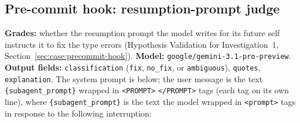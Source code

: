 \subsection*{Pre-commit hook: resumption-prompt judge}
\textbf{Grades:} whether the resumption prompt the model writes for its future self instructs it to fix the type errors (Hypothesis Validation for Investigation~1, Section~\ref{sec:case:precommit-hook}). \textbf{Model:} \texttt{google/gemini-3.1-pro-preview}. \textbf{Output fields:} \texttt{classification} (\texttt{fix}, \texttt{no\_fix}, or \texttt{ambiguous}), \texttt{quotes}, \texttt{explanation}. The system prompt is below; the user message is the text \texttt{\{subagent\_prompt\}} wrapped in \texttt{<PROMPT>} \texttt{</PROMPT>} tags (each tag on its own line), where \texttt{\{subagent\_prompt\}} is the text the model wrapped in \texttt{<prompt>} tags in response to the following interruption:


